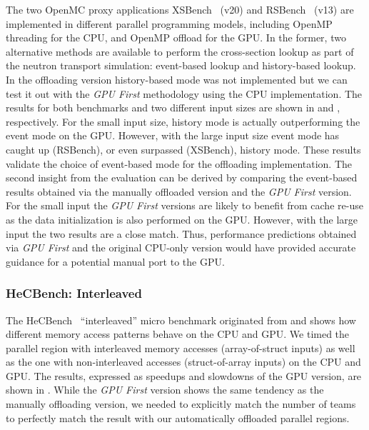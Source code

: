 The two OpenMC proxy applications XSBench~\cite{XS_Tramm_2014} (v20) and RSBench~\cite{DBLP:conf/easc/TrammSFJ14} (v13) are implemented in different parallel programming models, including OpenMP threading for the CPU, and OpenMP offload for the GPU.
In the former, two alternative methods are available to perform the cross-section lookup as part of the neutron transport simulation: event-based lookup and history-based lookup.
In the offloading version history-based mode was not implemented but we can test it out with the \emph{GPU First} methodology using the CPU implementation.
The results for both benchmarks and two different input sizes are shown in  and , respectively.
For the small input size, history mode is actually outperforming the event mode on the GPU.
However, with the large input size event mode has caught up (RSBench), or even surpassed (XSBench), history mode.
These results validate the choice of event-based mode for the offloading implementation.
The second insight from the evaluation can be derived by comparing the event-based results obtained via the manually offloaded version and the \emph{GPU First} version.
For the small input the \emph{GPU First} versions are likely to benefit from cache re-use as the data initialization is also performed on the GPU.
However, with the large input the two results are a close match.
Thus, performance predictions obtained via \emph{GPU First} and the original CPU-only version would have provided accurate guidance for a potential manual port to the GPU.

\subsubsection{HeCBench: Interleaved}

The HeCBench~\cite{zjin-lcf/HeCBench} ``interleaved'' micro benchmark originated from \citet{cook2012cuda} and shows how different memory access patterns behave on the CPU and GPU.
We timed the parallel region with interleaved memory accesses (array-of-struct inputs) as well as the one with non-interleaved accesses (struct-of-array inputs) on the CPU and GPU.
The results, expressed as speedups and slowdowns of the GPU version, are shown in .
While the \emph{GPU First} version shows the same tendency as the manually offloading version, we needed to explicitly match the number of teams to perfectly match the result with our automatically offloaded parallel regions.


